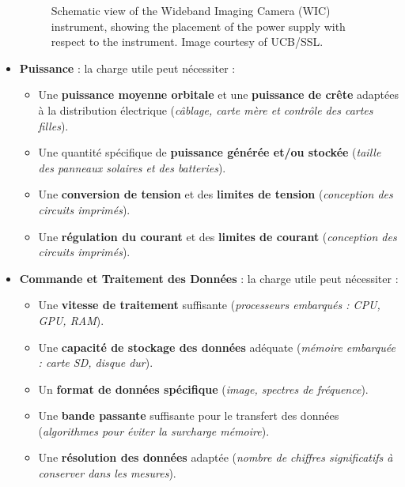 \begin{itemize}
\begin{figure}[H]
    		\caption{Schematic view of the Wideband Imaging Camera (WIC) instrument, showing the placement of the power supply with respect to the 							instrument. Image courtesy of UCB/SSL.}
    		\label{fig:communication2}
	\end{figure}
    \item \textbf{Puissance} : la charge utile peut nécessiter :
    \begin{itemize}
        \item Une \textbf{puissance moyenne orbitale} et une \textbf{puissance de crête} adaptées à la distribution électrique (\textit{câblage, carte 					mère et contrôle des cartes filles}).  
        \item Une quantité spécifique de \textbf{puissance générée et/ou stockée} (\textit{taille des panneaux solaires et des batteries}).  
        \item Une \textbf{conversion de tension} et des \textbf{limites de tension} (\textit{conception des circuits imprimés}).  
        \item Une \textbf{régulation du courant} et des \textbf{limites de courant} (\textit{conception des circuits imprimés}).  
    \end{itemize}
    \item \textbf{Commande et Traitement des Données} : la charge utile peut nécessiter :
    \begin{itemize}
        \item Une \textbf{vitesse de traitement} suffisante (\textit{processeurs embarqués : CPU, GPU, RAM}).  
        \item Une \textbf{capacité de stockage des données} adéquate (\textit{mémoire embarquée : carte SD, disque dur}).  
        \item Un \textbf{format de données spécifique} (\textit{image, spectres de fréquence}).  
        \item Une \textbf{bande passante} suffisante pour le transfert des données (\textit{algorithmes pour éviter la surcharge mémoire}).  
        \item Une \textbf{résolution des données} adaptée (\textit{nombre de chiffres significatifs à conserver dans les mesures}).  
    \end{itemize}


\end{itemize}
